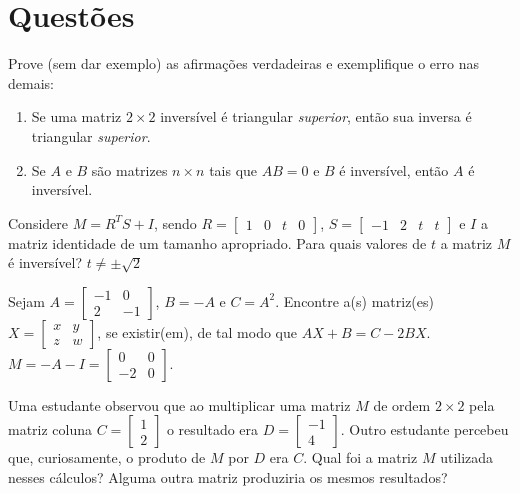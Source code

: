 \documentclass[12pt,a4paper]{article}
\newcommand{\fixme}{{\color{red}(...)}}
\begin{document}
\section*{Questões}
\begin{ExerciseList}

\Exercise[title={2,5}] Prove (sem dar exemplo) as afirmações verdadeiras e exemplifique o erro nas demais:
\begin{enumerate}
\item Se uma matriz $2 \times 2$ inversível é triangular \textit{superior}, então sua inversa é triangular \textit{superior}.
\item Se $A$ e $B$ são matrizes $n \times n$ tais que $AB = 0$ e $B$ é inversível, então $A$ é inversível.
\end{enumerate}
\Answer \fixme

\Exercise[title={2,5}] Considere $M = R^T S + I$, sendo $R = \begin{bmatrix}
1 & 0 & t & 0
\end{bmatrix}$, $S = \begin{bmatrix}
-1 & 2 & t & t
\end{bmatrix}$ e $I$ a matriz identidade de um tamanho apropriado. Para quais valores de $t$ a matriz $M$ é inversível?
\Answer $t \neq \pm \sqrt{2}$

\Exercise[title={2,5}] Sejam $
A =
\begin{bmatrix}
-1 &  0 \\
 2 & -1
\end{bmatrix}
$, $B = -A$ e $C = A^2$. Encontre a(s) matriz(es) $
X =
\begin{bmatrix}
x & y \\
z & w
\end{bmatrix}
$, se existir(em), de tal modo que $AX + B = C - 2BX$.
\Answer $M = -A - I =
\begin{bmatrix}
 0 & 0 \\
-2 & 0
\end{bmatrix}$.

\Exercise[title={2,5}] Uma estudante observou que ao multiplicar uma matriz $M$ de ordem $2\times 2$ pela matriz coluna $C =
\begin{bmatrix}
1\\2
\end{bmatrix}
$ o resultado era $D =
\begin{bmatrix}
-1\\4
\end{bmatrix}
$. Outro estudante percebeu que, curiosamente, o produto de $M$ por $D$ era $C$. Qual foi a matriz $M$ utilizada nesses cálculos? Alguma outra matriz produziria os mesmos resultados?


\end{ExerciseList}
\end{document}
